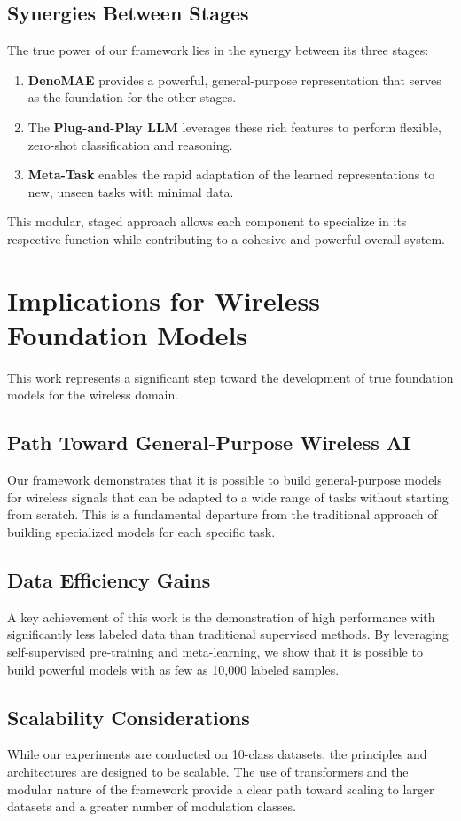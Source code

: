 \subsection{Synergies Between Stages}
The true power of our framework lies in the synergy between its three stages:
\begin{enumerate}
    \item \textbf{DenoMAE} provides a powerful, general-purpose representation that serves as the foundation for the other stages.
    \item The \textbf{Plug-and-Play LLM} leverages these rich features to perform flexible, zero-shot classification and reasoning.
    \item \textbf{Meta-Task} enables the rapid adaptation of the learned representations to new, unseen tasks with minimal data.
\end{enumerate}
This modular, staged approach allows each component to specialize in its respective function while contributing to a cohesive and powerful overall system.

\section{Implications for Wireless Foundation Models}
This work represents a significant step toward the development of true foundation models for the wireless domain.

\subsection{Path Toward General-Purpose Wireless AI}
Our framework demonstrates that it is possible to build general-purpose models for wireless signals that can be adapted to a wide range of tasks without starting from scratch. This is a fundamental departure from the traditional approach of building specialized models for each specific task.

\subsection{Data Efficiency Gains}
A key achievement of this work is the demonstration of high performance with significantly less labeled data than traditional supervised methods. By leveraging self-supervised pre-training and meta-learning, we show that it is possible to build powerful models with as few as 10,000 labeled samples.

\subsection{Scalability Considerations}
While our experiments are conducted on 10-class datasets, the principles and architectures are designed to be scalable. The use of transformers and the modular nature of the framework provide a clear path toward scaling to larger datasets and a greater number of modulation classes.

